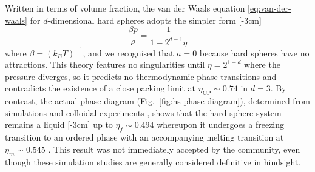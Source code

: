 \documentclass[11pt,twoside]{report}
\begin{document}
Written in terms of volume fraction, the van der Waals equation \eqref{eq:van-der-waals} for $d$-dimensional hard spheres adopts the simpler form%
[-3cm]
\begin{equation}\label{eq:van-der-waals-hs}
  \frac{\beta p}{\rho} = \frac{1}{1 - 2^{d-1} \eta}
\end{equation}
where $\beta = (k_B T)^{-1}$, and we recognised that $a = 0$ because hard spheres have no attractions.
This theory features no singularities until $\eta = 2^{1-d}$ where the pressure diverges, so it predicts no thermodynamic phase transitions and contradicts the existence of a close packing limit at $\eta_\mathrm{CP} \sim 0.74$ in $d=3$.
By contrast, the actual phase diagram (Fig.\ \ref{fig:hs-phase-diagram}), determined from simulations \cite{AlderJCP1957,WoodJCP1957,HooverJCP1968} and colloidal experiments \cite{PuseyN1986}, shows that the hard sphere system remains a liquid%
[-3cm]
up to $\eta_f \sim 0.494$ whereupon it undergoes a freezing transition to an ordered phase with an accompanying melting transition at $\eta_m \sim 0.545$ \cite{HooverJCP1968}.
This result was not immediately accepted by the community, even though these simulation studies are generally considered definitive in hindsight.
\end{document}
